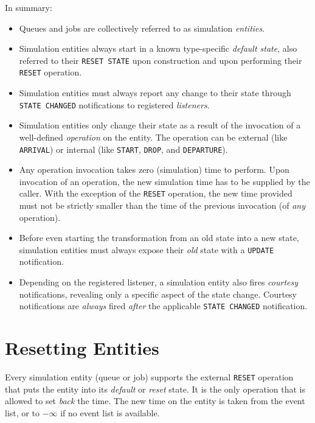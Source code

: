 In summary:
\begin{itemize}
  \item Queues and jobs are collectively referred to as simulation {\em entities}.
  \item Simulation entities always start in a known type-specific {\em default state},
          also referred to their \lstinline|RESET STATE| upon construction
          and upon performing their \lstinline|RESET| operation.
  \item Simulation entities must always report any change to their state through
	  \lstinline|STATE CHANGED| notifications to registered {\em listeners}.
  \item Simulation entities only change their state
          as a result of the invocation of a well-defined
          {\em operation\/} on the entity.
        The operation can be external (like \lstinline-ARRIVAL-)
          or internal (like \lstinline-START-, \lstinline-DROP-, and \lstinline-DEPARTURE-).
  \item Any operation invocation takes zero (simulation) time to perform.
        Upon invocation of an operation, the new simulation time has to be supplied
          by the caller.
        With the exception of the \lstinline|RESET| operation,
          the new time provided must not be strictly smaller than the
          time of the previous invocation (of {\em any\/} operation).
  \item Before even starting the transformation from an old state into a new state,
	  simulation entities must always expose their {\em old\/} state
	  with a \lstinline|UPDATE| notification.
  \item Depending on the registered listener,
	  a simulation entity also fires {\em courtesy\/} notifications,
          revealing only a specific aspect of the state change.
        Courtesy notifications are {\em always\/} fired {\em after\/}
          the applicable \lstinline|STATE CHANGED| notification.
\end{itemize}

\section{Resetting Entities}

Every simulation entity (queue or job) supports the
external \lstinline-RESET- operation
that puts the entity into its {\em default\/} or
{\em reset\/} state.
It is the only operation that is allowed to
set {\em back\/} the time.
The new time on the entity is taken from the event list,
or to $-\infty$ if no event list is available.

